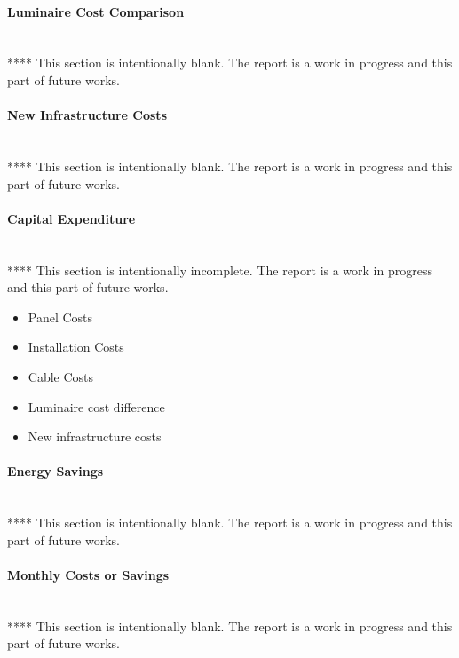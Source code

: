 \paragraph{Luminaire Cost Comparison}
~\\
****
\newline
This section is intentionally blank. The report is a work in progress and this part of future works.  

\paragraph{New Infrastructure Costs}
~\\
****
\newline
This section is intentionally blank. The report is a work in progress and this part of future works.  

\paragraph{Capital Expenditure}
~\\
****
\newline
This section is intentionally incomplete. The report is a work in progress and this part of future works.  

\begin{itemize}[noitemsep,nolistsep]
	\item Panel Costs
	\item Installation Costs
	\item Cable Costs
	\item Luminaire cost difference
	\item New infrastructure costs
\end{itemize}

\paragraph{Energy Savings}
~\\
****
\newline
This section is intentionally blank. The report is a work in progress and this part of future works.  

\paragraph{Monthly Costs or Savings}
~\\
****
\newline
This section is intentionally blank. The report is a work in progress and this part of future works.  

